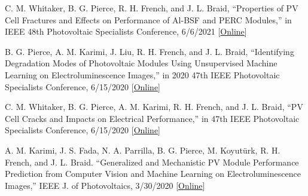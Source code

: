 \documentclass[10pt]{article}
\begin{document}
{\begin{newitemize}
     \item{C. M. Whitaker, { B. G. Pierce}, R. H. French, and J. L. Braid, ``Properties of PV Cell Fractures and Effects on Performance of Al-BSF and PERC Modules,” in IEEE 48th Photovoltaic Specialists Conference, 6/6/2021 [\href{https://ieeexplore.ieee.org/abstract/document/9519030}{Online}] }
    
    \item {{ B. G. Pierce}, A. M. Karimi, J. Liu, R. H. French, and J. L. Braid, ``Identifying Degradation Modes of Photovoltaic Modules Using Unsupervised Machine Learning on Electroluminescence Images,'' in 2020 47th IEEE Photovoltaic Specialists Conference, 6/15/2020 [\href{https://ieeexplore.ieee.org/abstract/document/9301021}{Online}] }
    
    
    \item{C. M. Whitaker, { B. G. Pierce}, A. M. Karimi, R. H. French, and J. L. Braid, ``PV Cell Cracks and Impacts on Electrical Performance,'' in 47th IEEE Photovoltaic Specialists Conference, 6/15/2020 [\href{https://ieeexplore.ieee.org/abstract/document/9300374}{Online}] } 
    
	\item{A. M. Karimi, J. S. Fada, N. A. Parrilla, { B. G. Pierce}, M. Koyutürk, R. H. French, and J. L. Braid. ``Generalized and Mechanistic PV Module Performance Prediction from Computer Vision and Machine Learning on Electroluminescence Images,'' IEEE J. of Photovoltaics, 3/30/2020 
	[\href{https://ieeexplore.ieee.org/abstract/document/9050914/}{Online}]}
    
%    
    
    

    
    
    
    
    
    
    
    

\end{newitemize}}
\end{document}
